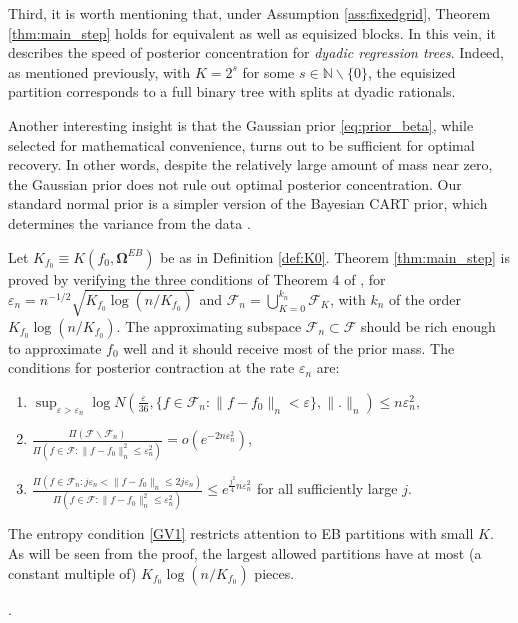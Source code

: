 \documentclass{article}
\newcommand{\1}{\mathbb{I}}
\newcommand{\e}{\varepsilon}
\newcommand{\bm}[1]{\boldsymbol{#1}}
\theoremstyle{assumption}
\begin{document}
Third, it is worth mentioning that, under Assumption \ref{ass:fixedgrid},  Theorem \ref{thm:main_step} holds for equivalent as well as equisized blocks. In this vein, it describes the speed of posterior concentration for {\sl dyadic regression trees}. Indeed, as mentioned previously, with  $K=2^s$ for some $s\in\mathbb{N}\backslash\{0\}$, the equisized  partition corresponds to a full binary tree with splits at dyadic rationals. 


Another interesting insight is that the Gaussian prior \eqref{eq:prior_beta}, while selected for mathematical convenience, turns out to be sufficient for optimal recovery.  In other words, despite the relatively large amount of {mass  near zero}, the Gaussian prior does not rule out optimal posterior concentration. Our standard normal prior is a simpler version of the Bayesian CART prior,  which determines the variance from the  data \cite{Chipman1998}. 





{Let $K_{f_0}\equiv K(f_0,\bm{\Omega}^{EB}) $ be as in Definition \ref{def:K0}. Theorem \ref{thm:main_step} is proved by verifying the three conditions of Theorem 4 of \cite{Ghosal2007}, for {$\e_n = n^{-1/2}\sqrt{K_{f_0}\log(n/K_{f_0})}$} and $\mathcal{F}_n = \bigcup_{K=0}^{k_n} \mathcal{F}_K$, with $k_n$ of the order {$K_{f_0}{\log(n/K_{f_0})}$}. The approximating subspace $\mathcal{F}_n\subset\mathcal{F}$ should be rich enough to approximate  $f_0$ well and it should receive most of the prior mass. The conditions for posterior contraction at the rate $\e_n$ are:
\begin{enumerate}[label=({C\arabic*})]
\item \label{GV1} $\displaystyle \sup_{\e > \e_n} \log N\left(\tfrac{\e}{36}, \{f \in \mathcal{F}_n : \|f - f_0\|_n < \e\}, \|.\|_n\right) \leq n\e_n^2,$
\item \label{GV2} $\displaystyle \frac{\Pi(\mathcal{F} \backslash \mathcal{F}_n)}{\Pi(f \in \mathcal{F} : \|f-f_0\|_n^2 \leq \e_n^2)} = o(e^{-2n\e_n^2}),$
\item \label{GV3} $\displaystyle \frac{\Pi(f \in \mathcal{F}_n : j\e_n < \|f - f_0\|_n \leq 2j\e_n)}{\Pi(f \in \mathcal{F} : \|f-f_0\|_n^2 \leq \e_n^2)} \leq e^{\frac{j^2}{4}n\e_n^2}$ for all sufficiently large $j$.
\end{enumerate}


 The entropy condition \ref{GV1} restricts  attention to EB partitions with small $K$. As will be seen from the proof, the largest allowed partitions   have at most (a constant multiple of) $K_{f_0}\log{(n/K_{f_0})}$ pieces.}. 
\end{document}
